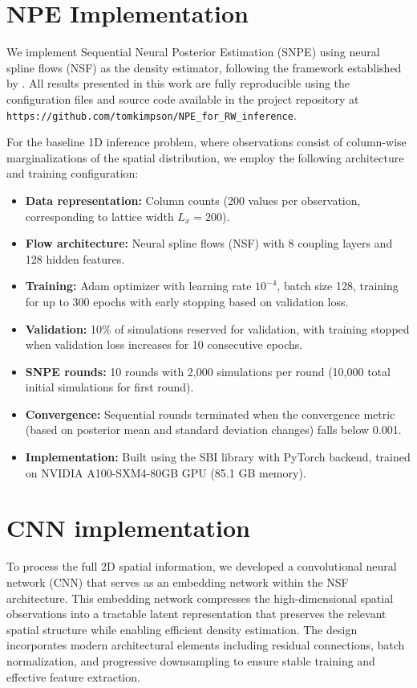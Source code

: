 \section{NPE Implementation}\label{ap:npe_implementaion}

We implement Sequential Neural Posterior Estimation (SNPE) using neural spline flows (NSF) as the density estimator, following the framework established by \citet{sbi}. All results presented in this work are fully reproducible using the configuration files and source code available in the project repository at \texttt{https://github.com/tomkimpson/NPE\_for\_RW\_inference}.

For the baseline 1D inference problem, where observations consist of column-wise marginalizations of the spatial distribution, we employ the following architecture and training configuration:
\begin{itemize}
	\item \textbf{Data representation:} Column counts (200 values per observation, corresponding to lattice width $L_x = 200$).
	\item \textbf{Flow architecture:} Neural spline flows (NSF) with 8 coupling layers and 128 hidden features.
	\item \textbf{Training:} Adam optimizer with learning rate $10^{-4}$, batch size 128, training for up to 300 epochs with early stopping based on validation loss.
	\item \textbf{Validation:} 10\% of simulations reserved for validation, with training stopped when validation loss increases for 10 consecutive epochs.
	\item \textbf{SNPE rounds:} 10 rounds with 2,000 simulations per round (10,000 total initial simulations for first round).
	\item \textbf{Convergence:} Sequential rounds terminated when the convergence metric (based on posterior mean and standard deviation changes) falls below 0.001.
	\item \textbf{Implementation:} Built using the SBI library \citep{sbi} with PyTorch backend, trained on NVIDIA A100-SXM4-80GB GPU (85.1 GB memory).
\end{itemize}



\section{CNN implementation} \label{ap:cnn}

To process the full 2D spatial information, we developed a convolutional neural network (CNN) that serves as an embedding network within the NSF architecture. This embedding network compresses the high-dimensional spatial observations into a tractable latent representation that preserves the relevant spatial structure while enabling efficient density estimation. The design incorporates modern architectural elements including residual connections, batch normalization, and progressive downsampling to ensure stable training and effective feature extraction.

